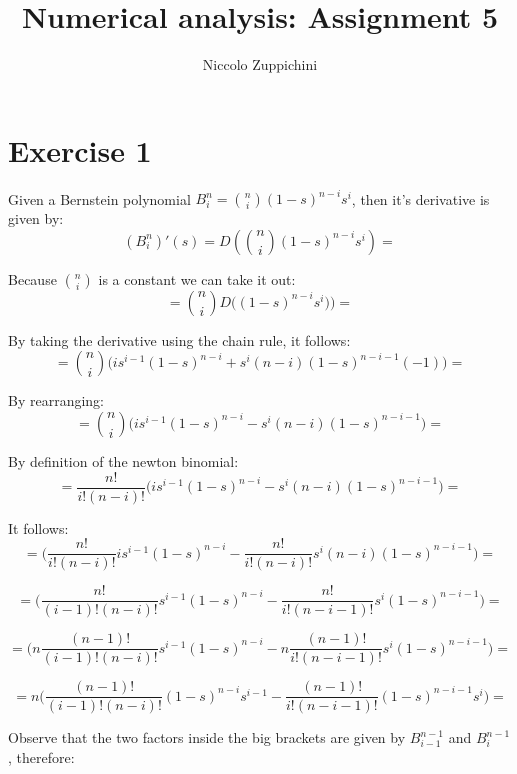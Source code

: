 \documentclass[12pt]{article}
\title{Numerical analysis: Assignment 5}
\author{Niccolo Zuppichini}
\begin{document}
\maketitle
\section*{Exercise 1}

Given a Bernstein polynomial $B^n_i =  \binom{n}{i} (1-s)^{n-i} s^i$, then it's derivative is given by: \\


$$(B^n_i)'(s) = D(\binom{n}{i} (1-s)^{n-i} s^i) = $$

Because $\binom{n}{i} $ is a constant we can take it out: \\

$$ = \binom{n}{i}  D \bigg( (1-s)^{n-i} s^i) \bigg) = $$

By taking the derivative using the chain rule, it follows: \\

$$ =  \binom{n}{i}  \bigg( i s^{i-1} (1-s)^{n-i} + s^i (n-i) (1-s)^{n-i-1} (-1) \bigg) = $$

By rearranging: \\

$$ = \binom{n}{i}  \bigg( i s^{i-1} (1-s)^{n-i} - s^i (n-i) (1-s)^{n-i-1}  \bigg) = $$

By definition of the newton binomial: \\

$$ = \frac{n!}{i! (n-i)!} \bigg( i s^{i-1} (1-s)^{n-i} - s^i (n-i) (1-s)^{n-i-1}  \bigg) = $$ 

It follows: \\

$$ =  \bigg(\frac{n!}{i! (n-i)!} i s^{i-1} (1-s)^{n-i} - \frac{n!}{i! (n-i)!} s^i (n-i) (1-s)^{n-i-1}  \bigg) = $$

$$ =  \bigg(\frac{n!}{(i-1)! (n-i)!} s^{i-1} (1-s)^{n-i} - \frac{n!}{i! (n-i-1)!} s^i (1-s)^{n-i-1}  \bigg) =$$

$$ = \bigg(n \frac{(n-1)!}{(i-1)! (n-i)!}  s^{i-1} (1-s)^{n-i} - n \frac{(n-1)!}{i! (n-i-1)!} s^i (1-s)^{n-i-1}  \bigg) =$$

$$ = n \bigg(\frac{(n-1)!}{(i-1)! (n-i)!} (1-s)^{n-i} s^{i-1} - \frac{(n-1)!}{i! (n-i-1)!}   (1-s)^{n-i-1} s^i \bigg) =$$

Observe that the two factors inside the big brackets are given by $B_{i-1}^{n-1}$ and $B_{i}^{n-1}$, therefore: \\
\end{document}
